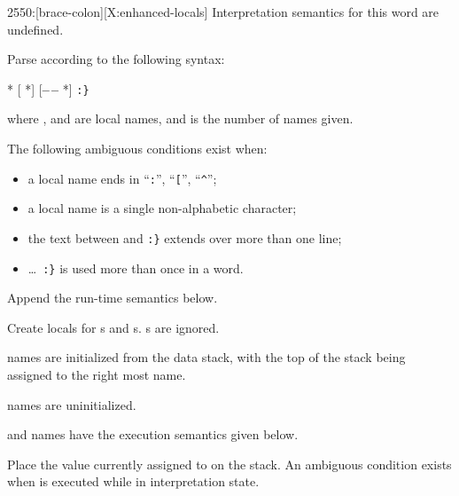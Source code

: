 
\begin{worddef}[b:]{2550}{\brace:}[brace-colon][X:enhanced-locals]
\interpret
	Interpretation semantics for this word are undefined.

\compile

	Parse  according to the following syntax:
	\begin{center}
		 * [\textbf{\textbar} *] [\textbf{--\,--} *] \verb":}"
	\end{center}
	where ,  and  are local names, and
	 is the number of  names given.

	The following ambiguous conditions exist when:
	\begin{itemize}
	\item a local name ends in ``\texttt{:}'', ``\texttt{[}'', ``\texttt{\textasciicircum}'';
	\item a local name is a single non-alphabetic character;
	\item the text between  and \texttt{:\}} extends
			over more than one line;
	\item {} \ldots\ \texttt{:\}} is used more than once in a word.
	\end{itemize}

	Append the run-time semantics below. 

\runtime

	Create locals for s and s. s are ignored.

	\begin{list}{}{
		\setlength{\leftmargin}{2.6em}
		\setlength{\labelwidth}{2.4em}
	}
	\item[\arg{arg}] names are initialized from the data stack, with the
		top of the stack being assigned to the right most  name.

	\item[\arg{val}] names are uninitialized.
	\end{list}

	 and  names have the execution semantics
		given below.

\execute[name]

	Place the value currently assigned to  on the stack.
	An ambiguous condition exists when  is executed while
	in interpretation state.


\end{worddef}
